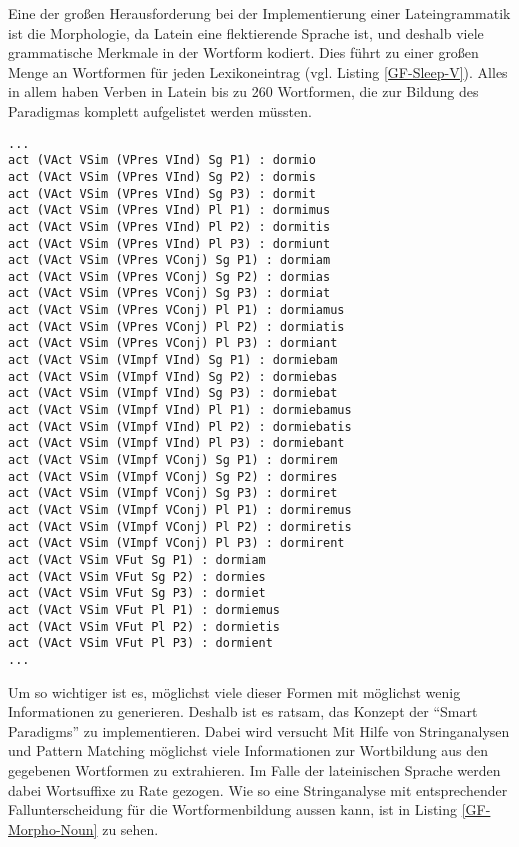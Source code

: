 Eine der großen Herausforderung bei der Implementierung einer Lateingrammatik ist die Morphologie, da Latein eine flektierende Sprache ist, und deshalb viele grammatische Merkmale in der Wortform kodiert. Dies führt zu einer großen Menge an Wortformen für jeden Lexikoneintrag (vgl. Listing \ref{GF-Sleep-V}). Alles in allem haben Verben in Latein bis zu 260 Wortformen, die zur Bildung des Paradigmas komplett aufgelistet werden müssten. \par
\begin{lstlisting}[float=h!tp,caption={Ausschnitt aus dem Paradigma des Verbs \texttt{sleep\_V}},label={GF-Sleep-V},basicstyle=\small]
...
act (VAct VSim (VPres VInd) Sg P1) : dormio
act (VAct VSim (VPres VInd) Sg P2) : dormis
act (VAct VSim (VPres VInd) Sg P3) : dormit
act (VAct VSim (VPres VInd) Pl P1) : dormimus
act (VAct VSim (VPres VInd) Pl P2) : dormitis
act (VAct VSim (VPres VInd) Pl P3) : dormiunt
act (VAct VSim (VPres VConj) Sg P1) : dormiam
act (VAct VSim (VPres VConj) Sg P2) : dormias
act (VAct VSim (VPres VConj) Sg P3) : dormiat
act (VAct VSim (VPres VConj) Pl P1) : dormiamus
act (VAct VSim (VPres VConj) Pl P2) : dormiatis
act (VAct VSim (VPres VConj) Pl P3) : dormiant
act (VAct VSim (VImpf VInd) Sg P1) : dormiebam
act (VAct VSim (VImpf VInd) Sg P2) : dormiebas
act (VAct VSim (VImpf VInd) Sg P3) : dormiebat
act (VAct VSim (VImpf VInd) Pl P1) : dormiebamus
act (VAct VSim (VImpf VInd) Pl P2) : dormiebatis
act (VAct VSim (VImpf VInd) Pl P3) : dormiebant
act (VAct VSim (VImpf VConj) Sg P1) : dormirem
act (VAct VSim (VImpf VConj) Sg P2) : dormires
act (VAct VSim (VImpf VConj) Sg P3) : dormiret
act (VAct VSim (VImpf VConj) Pl P1) : dormiremus
act (VAct VSim (VImpf VConj) Pl P2) : dormiretis
act (VAct VSim (VImpf VConj) Pl P3) : dormirent
act (VAct VSim VFut Sg P1) : dormiam
act (VAct VSim VFut Sg P2) : dormies
act (VAct VSim VFut Sg P3) : dormiet
act (VAct VSim VFut Pl P1) : dormiemus
act (VAct VSim VFut Pl P2) : dormietis
act (VAct VSim VFut Pl P3) : dormient
...
\end{lstlisting}
Um so wichtiger ist es, möglichst viele dieser Formen mit möglichst wenig Informationen zu generieren. Deshalb ist es ratsam, das Konzept der "`Smart Paradigms"' zu implementieren. Dabei wird versucht Mit Hilfe von Stringanalysen und Pattern Matching möglichst viele Informationen zur Wortbildung aus den gegebenen Wortformen zu extrahieren. Im Falle der lateinischen Sprache werden dabei Wortsuffixe zu Rate gezogen. Wie so eine Stringanalyse mit entsprechender Fallunterscheidung für die Wortformenbildung aussen kann, ist in Listing \ref{GF-Morpho-Noun} zu sehen.\par

